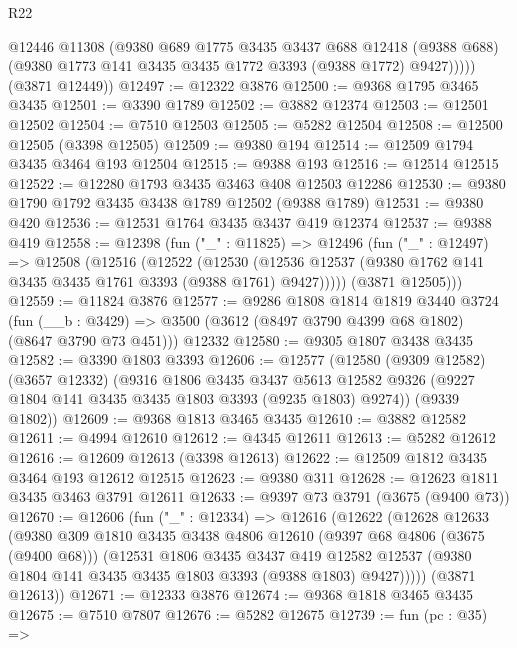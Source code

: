 \begin{lexlean}{R22}
\begin{coremodule}
            @12446
            @11308
            (@9380
              @689
              @1775
              @3435
              @3437
              @688
              @12418
              (@9388 @688)
              (@9380 @1773 @141 @3435 @3435 @1772 @3393 (@9388 @1772) @9427)))))
      (@3871 @12449))
@12497 := @12322 @3876
@12500 := @9368 @1795 @3465 @3435
@12501 := @3390 @1789
@12502 := @3882 @12374
@12503 := @12501 @12502
@12504 := @7510 @12503
@12505 := @5282 @12504
@12508 := @12500 @12505 (@3398 @12505)
@12509 := @9380 @194
@12514 := @12509 @1794 @3435 @3464 @193 @12504
@12515 := @9388 @193
@12516 := @12514 @12515
@12522 := @12280 @1793 @3435 @3463 @408 @12503 @12286
@12530 := @9380 @1790 @1792 @3435 @3438 @1789 @12502 (@9388 @1789)
@12531 := @9380 @420
@12536 := @12531 @1764 @3435 @3437 @419 @12374
@12537 := @9388 @419
@12558 := @12398
    (fun ("_" : @11825) =>
    @12496
      (fun ("_" : @12497) =>
      @12508
        (@12516
          (@12522
            (@12530
              (@12536 @12537 (@9380 @1762 @141 @3435 @3435 @1761 @3393 (@9388 @1761) @9427)))))
        (@3871 @12505)))
@12559 := @11824 @3876
@12577 := @9286
    @1808
    @1814
    @1819
    @3440
    @3724
    (fun (__b : @3429) => @3500 (@3612 (@8497 @3790 @4399 @68 @1802) (@8647 @3790 @73 @451)))
    @12332
@12580 := @9305 @1807 @3438 @3435
@12582 := @3390 @1803 @3393
@12606 := @12577
    (@12580
      (@9309 @12582)
      (@3657 @12332)
      (@9316
        @1806
        @3435
        @3437
        @5613
        @12582
        @9326
        (@9227 @1804 @141 @3435 @3435 @1803 @3393 (@9235 @1803) @9274))
      (@9339 @1802))
@12609 := @9368 @1813 @3465 @3435
@12610 := @3882 @12582
@12611 := @4994 @12610
@12612 := @4345 @12611
@12613 := @5282 @12612
@12616 := @12609 @12613 (@3398 @12613)
@12622 := @12509 @1812 @3435 @3464 @193 @12612 @12515
@12623 := @9380 @311
@12628 := @12623 @1811 @3435 @3463 @3791 @12611
@12633 := @9397 @73 @3791 (@3675 (@9400 @73))
@12670 := @12606
    (fun ("_" : @12334) =>
    @12616
      (@12622
        (@12628
          @12633
          (@9380
            @309
            @1810
            @3435
            @3438
            @4806
            @12610
            (@9397 @68 @4806 (@3675 (@9400 @68)))
            (@12531
              @1806
              @3435
              @3437
              @419
              @12582
              @12537
              (@9380 @1804 @141 @3435 @3435 @1803 @3393 (@9388 @1803) @9427)))))
      (@3871 @12613))
@12671 := @12333 @3876
@12674 := @9368 @1818 @3465 @3435
@12675 := @7510 @7807
@12676 := @5282 @12675
@12739 := fun (pc : @35) =>

\end{coremodule}
\end{lexlean}
